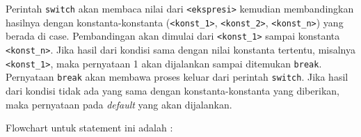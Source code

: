 Perintah \texttt{switch} akan membaca nilai dari
\texttt{\textless{}ekspresi\textgreater{}} kemudian membandingkan
hasilnya dengan konstanta-konstanta
(\texttt{\textless{}konst\_1\textgreater{}},
\texttt{\textless{}konst\_2\textgreater{}},
\texttt{\textless{}konst\_n\textgreater{}}) yang berada di case.
Pembandingan akan dimulai dari
\texttt{\textless{}konst\_1\textgreater{}} sampai konstanta
\texttt{\textless{}konst\_n\textgreater{}}. Jika hasil dari kondisi sama
dengan nilai konstanta tertentu, misalnya
\texttt{\textless{}konst\_1\textgreater{}}, maka pernyataan 1 akan
dijalankan sampai ditemukan \texttt{break}. Pernyataan \texttt{break}
akan membawa proses keluar dari perintah \texttt{switch}. Jika hasil
dari kondisi tidak ada yang sama dengan konstanta-konstanta yang
diberikan, maka pernyataan pada \emph{default} yang akan dijalankan.

Flowchart untuk statement ini adalah :

